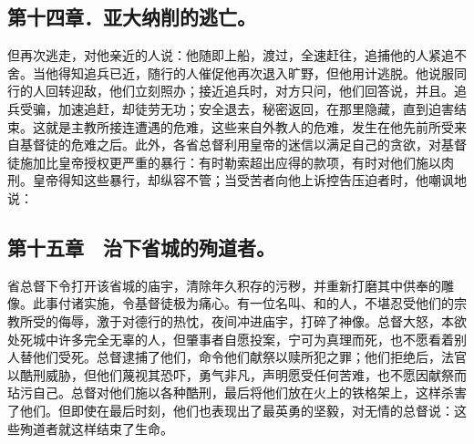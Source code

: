 
\subsection{第十四章．亚大纳削的逃亡。}

但再次逃走，对他亲近的人说：他随即上船，渡过，全速赶往，追捕他的人紧追不舍。当他得知追兵已近，随行的人催促他再次退入旷野，但他用计逃脱。他说服同行的人回转迎敌，他们立刻照办；接近追兵时，对方只问，他们回答说，并且。追兵受骗，加速追赶，却徒劳无功；安全退去，秘密返回，在那里隐藏，直到迫害结束。这就是主教所接连遭遇的危难，这些来自外教人的危难，发生在他先前所受来自基督徒的危难之后。此外，各省总督利用皇帝的迷信以满足自己的贪欲，对基督徒施加比皇帝授权更严重的暴行：有时勒索超出应得的款项，有时对他们施以肉刑。皇帝得知这些暴行，却纵容不管；当受苦者向他上诉控告压迫者时，他嘲讽地说：\par


\subsection{第十五章　治下省城的殉道者。}

省总督下令打开该省城的庙宇，清除年久积存的污秽，并重新打磨其中供奉的雕像。此事付诸实施，令基督徒极为痛心。有一位名叫、和的人，不堪忍受他们的宗教所受的侮辱，激于对德行的热忱，夜间冲进庙宇，打碎了神像。总督大怒，本欲处死城中许多完全无辜的人，但肇事者自愿投案，宁可为真理而死，也不愿看着别人替他们受死。总督逮捕了他们，命令他们献祭以赎所犯之罪；他们拒绝后，法官以酷刑威胁，但他们蔑视其恐吓，勇气非凡，声明愿受任何苦难，也不愿因献祭而玷污自己。总督对他们施以各种酷刑，最后将他们放在火上的铁格架上，这样杀害了他们。但即使在最后时刻，他们也表现出了最英勇的坚毅，对无情的总督说：这些殉道者就这样结束了生命。\par

